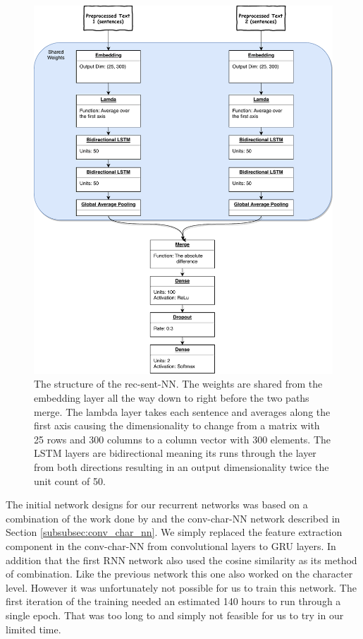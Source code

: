 \begin{figure}
    \centering
    \includegraphics[width=\textwidth]{./pictures/experiments/rec_sent_nn/model}
    \caption{The structure of the \gls{rec-sent-NN}. The weights are shared
    from the embedding layer all the way down to right before the two paths
    merge. The lambda layer takes each sentence and averages along the first
    axis causing the dimensionality to change from a matrix with 25 rows and
    300 columns to a column vector with 300 elements. The LSTM layers are
    bidirectional meaning its runs through the layer from both directions
    resulting in an output dimensionality twice the unit count of 50.}
    \label{fig:rec-sent-NN}
\end{figure}

The initial network designs for our recurrent networks was based on a
combination of the work done by \citet{qian:2018} and the \gls{conv-char-NN}
network described in Section \ref{subsubsec:conv_char_nn}. We simply replaced
the feature extraction component in the \gls{conv-char-NN} from convolutional
layers to \gls{GRU} layers. In addition that the first \gls{RNN} network
also used the cosine similarity as its method of combination. Like the
previous network this one also worked on the character level. However it was
unfortunately not possible for us to train this network. The first iteration of
the training needed an estimated 140 hours to run through a single epoch. That
was too long to and simply not feasible for us to try in our limited time.

